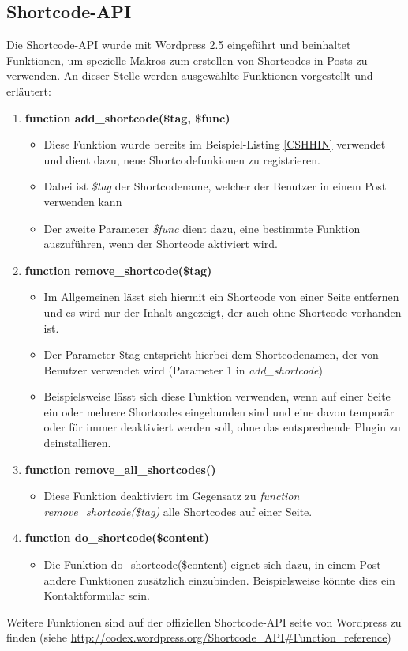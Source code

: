 \subsection{Shortcode-API}\label{shapi}
Die Shortcode-\gls{API} wurde mit Wordpress 2.5 eingeführt und beinhaltet Funktionen, um spezielle Makros zum erstellen von Shortcodes in Posts zu verwenden.\newline
An dieser Stelle werden ausgewählte Funktionen vorgestellt und erläutert:
\begin{enumerate}
	\item {\bf function add\_shortcode(\$tag, \$func)} 
	\begin{itemize}
		\item Diese Funktion wurde bereits im Beispiel-Listing \ref{CSHHIN} verwendet und dient dazu, neue Shortcodefunkionen zu registrieren.
		\item Dabei ist \emph{\$tag} der Shortcodename, welcher der Benutzer in einem Post verwenden kann
		\item Der zweite Parameter \emph{\$func} dient dazu, eine bestimmte Funktion auszuführen, wenn der Shortcode aktiviert wird.
	\end{itemize}
	\item {\bf function remove\_shortcode(\$tag)} 
	\begin{itemize}
		\item Im Allgemeinen lässt sich hiermit ein Shortcode von einer Seite entfernen und es wird nur der Inhalt angezeigt, der auch ohne Shortcode vorhanden ist.
		\item Der Parameter \$tag entspricht hierbei dem Shortcodenamen, der von Benutzer verwendet wird (Parameter 1 in \emph{add\_shortcode})
		\item Beispielsweise lässt sich diese Funktion verwenden, wenn auf einer Seite ein oder mehrere Shortcodes eingebunden sind und eine davon temporär oder für immer deaktiviert werden soll, ohne das entsprechende Plugin zu deinstallieren.
	\end{itemize}
	\item {\bf function remove\_all\_shortcodes()} 
	\begin{itemize}
		\item Diese Funktion deaktiviert im Gegensatz zu \emph{function remove\_shortcode(\$tag)} alle Shortcodes auf einer Seite.
	\end{itemize}
	\item {\bf function do\_shortcode(\$content)} 
	\begin{itemize}
		\item Die Funktion do\_shortcode(\$content) eignet sich dazu, in einem Post andere Funktionen zusätzlich einzubinden. Beispielsweise könnte dies ein Kontaktformular sein.
	\end{itemize}
\end{enumerate}
Weitere Funktionen sind auf der offiziellen Shortcode-API seite von Wordpress zu finden (siehe \url{http://codex.wordpress.org/Shortcode\_API#Function\_reference})

